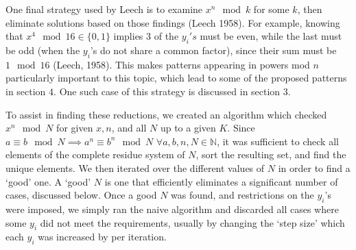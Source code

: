 \documentclass{article}
\begin{document}
\begin{flushleft}
\vspace{.1in}

One final strategy used by Leech is to examine $x^n \mod k$ for some $k$, then eliminate solutions based on those findings (Leech 1958). For example, knowing that $x^4 \mod 16 \in \{0, 1\}$ implies $3$ of the $y_i's$ must be even, while the last must be odd (when the $y_i$'s do not share a common factor), since their sum must be $1 \mod 16$ (Leech, 1958). This makes patterns appearing in powers mod $n$ particularly important to this topic, which lead to some of the proposed patterns in section $4$. One such case of this strategy is discussed in section $3$.

\vspace{.1in}

To assist in finding these reductions, we created an algorithm which checked $x^n \mod N$ for given $x, n$, and all $N$ up to a given $K$. Since $a \equiv b \mod N \implies a^n \equiv b^n \mod N$ $\forall a, b, n, N \in \mathbb{N}$, it was sufficient to check all elements of the complete residue system of $N$, sort the resulting set, and find the unique elements. We then iterated over the different values of $N$ in order to find a `good' one. A `good' $N$ is one that efficiently eliminates a significant number of cases, discussed below. Once a good $N$ was found, and restrictions on the $y_i$'s were imposed, we simply ran the naive algorithm and discarded all cases where some $y_i$ did not meet the requirements, usually by changing the `step size' which each $y_i$ was increased by per iteration.


\end{flushleft}
\end{document}
